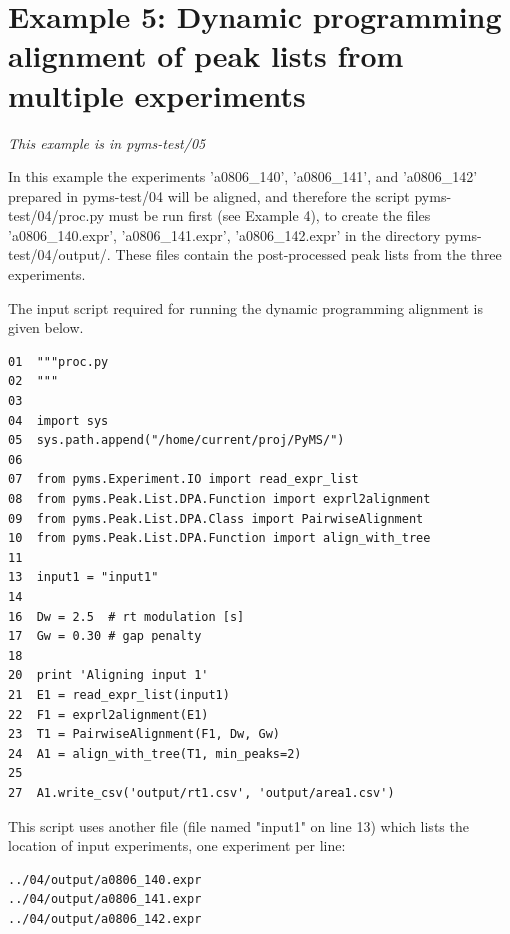 \section{Example 5: Dynamic programming alignment of peak lists from multiple
experiments}

\noindent
{\em This example is in pyms-test/05}

In this example the experiments 'a0806\_140', 'a0806\_141', and 'a0806\_142'
prepared in pyms-test/04 will be aligned, and therefore the script
pyms-test/04/proc.py must be run first (see Example 4), to create the files
'a0806\_140.expr', 'a0806\_141.expr', 'a0806\_142.expr' in the directory
pyms-test/04/output/. These files contain the post-processed peak lists
from the three experiments. 

The input script required for running the dynamic programming alignment
is given below.

\begin{verbatim}
01  """proc.py
02  """
03 
04  import sys
05  sys.path.append("/home/current/proj/PyMS/")
06  
07  from pyms.Experiment.IO import read_expr_list
08  from pyms.Peak.List.DPA.Function import exprl2alignment
09  from pyms.Peak.List.DPA.Class import PairwiseAlignment
10  from pyms.Peak.List.DPA.Function import align_with_tree
11  
13  input1 = "input1"
14  
16  Dw = 2.5  # rt modulation [s]
17  Gw = 0.30 # gap penalty
18  
20  print 'Aligning input 1'
21  E1 = read_expr_list(input1)
22  F1 = exprl2alignment(E1)
23  T1 = PairwiseAlignment(F1, Dw, Gw)
24  A1 = align_with_tree(T1, min_peaks=2)
25  
27  A1.write_csv('output/rt1.csv', 'output/area1.csv')
\end{verbatim}

\noindent
This script uses another file (file named "input1" on line 13) which lists
the location of input experiments, one experiment per line:

\begin{verbatim}
../04/output/a0806_140.expr
../04/output/a0806_141.expr
../04/output/a0806_142.expr
\end{verbatim}





